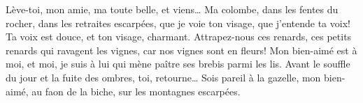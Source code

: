 Lève-toi, mon amie, ma toute belle, et viens…
Ma colombe, dans les fentes du rocher, dans les retraites escarpées, que je voie ton visage, que j’entende ta voix! Ta voix est douce, et ton visage, charmant.
Attrapez-nous ces renards, ces petits renards qui ravagent les vignes, car nos vignes sont en fleurs!
Mon bien-aimé est à moi, et moi, je suis à lui qui mène paître ses brebis parmi les lis.
Avant le souffle du jour et la fuite des ombres, toi, retourne… Sois pareil à la gazelle, mon bien-aimé, au faon de la biche, sur les montagnes escarpées.
